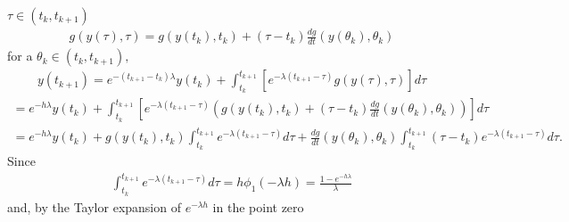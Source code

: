 \documentclass[letterpaper,10pt,english]{jupyterBook}
\begin{document}
\sphinxAtStartPar
\(\tau \in (t_k, t_{k+1})\)
\begin{equation*}
\begin{split}
    g(y(\tau), \tau) = g(y(t_k), t_k) + (\tau - t_k) \frac{dg}{dt} (y(\theta_k), \theta_k)
\end{split}
\end{equation*}
\sphinxAtStartPar
for a \(\theta_k \in (t_k, t_{k+1}),\)
\begin{equation*}
\begin{split}
    y(t_{k+1}) = e^{-(t_{k+1}-t_k) \lambda}y(t_k) + \int_{t_k}^{t_{k+1}} [e^{-\lambda(t_{k+1}-\tau)} g(y(\tau), \tau)] d\tau
\end{split}
\end{equation*}\begin{equation*}
\begin{split}
    = e^{-h \lambda}y(t_k) + \int_{t_k}^{t_{k+1}} \left[e^{-\lambda(t_{k+1}-\tau)} \left( g(y(t_k), t_k) + (\tau - t_k) \frac{dg}{dt} (y(\theta_k), \theta_k)\right)\right] d\tau
\end{split}
\end{equation*}\begin{equation*}
\begin{split}
    = e^{-h \lambda}y(t_k) + g(y(t_k), t_k) \int_{t_k}^{t_{k+1}} e^{-\lambda(t_{k+1}-\tau)} d\tau + \frac{dg}{dt} (y(\theta_k), \theta_k) \int_{t_k}^{t_{k+1}} (\tau - t_k) e^{-\lambda(t_{k+1}-\tau)} d\tau.
\end{split}
\end{equation*}
\sphinxAtStartPar
Since
\begin{equation*}
\begin{split}
    \int_{t_k}^{t_{k+1}} e^{-\lambda(t_{k+1}-\tau)} d\tau = h\phi_1(-\lambda h)= \frac{1-e^{-h \lambda}}{\lambda}
\end{split}
\end{equation*}
\sphinxAtStartPar
and, by the Taylor expansion of \(e^{-\lambda h}\) in the point zero
\end{document}

